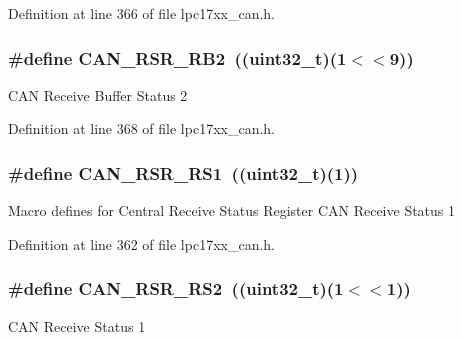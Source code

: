 \-Definition at line 366 of file lpc17xx\-\_\-can.\-h.

\hypertarget{group___c_a_n___private___macros_gab1ac3e4e0123263cfa50ea300e9db6ef}{
\subsubsection[{\-C\-A\-N\-\_\-\-R\-S\-R\-\_\-\-R\-B2}]{\setlength{\rightskip}{0pt plus 5cm}\#define {\bf \-C\-A\-N\-\_\-\-R\-S\-R\-\_\-\-R\-B2}~((uint32\-\_\-t)(1$<$$<$9))}}\label{group___c_a_n___private___macros_gab1ac3e4e0123263cfa50ea300e9db6ef}
\-C\-A\-N \-Receive \-Buffer \-Status 2 

\-Definition at line 368 of file lpc17xx\-\_\-can.\-h.

\hypertarget{group___c_a_n___private___macros_gad2cb8f1622173e454cfe4222a3c97a38}{
\subsubsection[{\-C\-A\-N\-\_\-\-R\-S\-R\-\_\-\-R\-S1}]{\setlength{\rightskip}{0pt plus 5cm}\#define {\bf \-C\-A\-N\-\_\-\-R\-S\-R\-\_\-\-R\-S1}~((uint32\-\_\-t)(1))}}\label{group___c_a_n___private___macros_gad2cb8f1622173e454cfe4222a3c97a38}
\-Macro defines for \-Central \-Receive \-Status \-Register \-C\-A\-N \-Receive \-Status 1 

\-Definition at line 362 of file lpc17xx\-\_\-can.\-h.

\hypertarget{group___c_a_n___private___macros_ga3ff0a3c25e826ceaeecd5be0e8bcc0c3}{
\subsubsection[{\-C\-A\-N\-\_\-\-R\-S\-R\-\_\-\-R\-S2}]{\setlength{\rightskip}{0pt plus 5cm}\#define {\bf \-C\-A\-N\-\_\-\-R\-S\-R\-\_\-\-R\-S2}~((uint32\-\_\-t)(1$<$$<$1))}}\label{group___c_a_n___private___macros_ga3ff0a3c25e826ceaeecd5be0e8bcc0c3}
\-C\-A\-N \-Receive \-Status 1 

